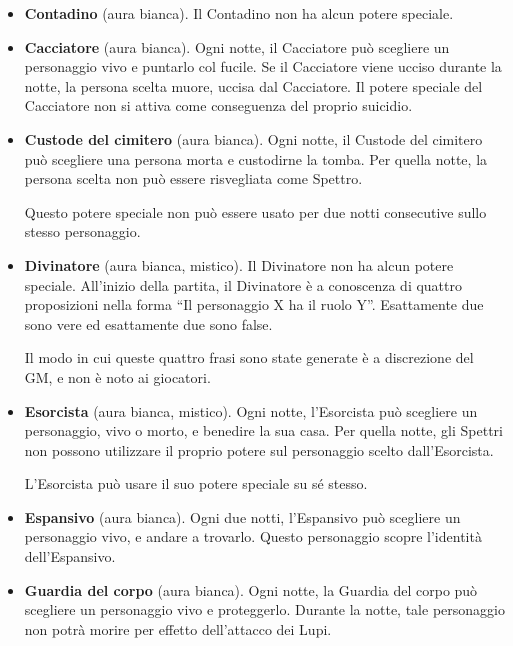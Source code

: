 \documentclass[a4paper,10pt]{article}
\begin{document}
\begin{itemize}
 \item {\bf Contadino} (aura bianca). Il Contadino non ha alcun potere speciale.

 \item {\bf Cacciatore} (aura bianca). Ogni notte, il Cacciatore può scegliere un personaggio vivo e puntarlo col fucile. Se il Cacciatore viene ucciso durante la notte, la persona scelta muore, uccisa dal Cacciatore.
 Il potere speciale del Cacciatore non si attiva come conseguenza del proprio suicidio.
 
 \item {\bf Custode del cimitero} (aura bianca). Ogni notte, il Custode del cimitero può scegliere una persona morta e custodirne la tomba. Per quella notte, la persona scelta non può essere risvegliata come Spettro.
 
 Questo potere speciale non può essere usato per due notti consecutive sullo stesso personaggio.

 \item {\bf Divinatore} (aura bianca, mistico). Il Divinatore non ha alcun potere speciale. All'inizio della partita, il Divinatore è a conoscenza di quattro proposizioni nella forma ``Il personaggio X ha il ruolo Y''. Esattamente due sono vere ed esattamente due sono false.
 
 Il modo in cui queste quattro frasi sono state generate è a discrezione del GM, e non è noto ai giocatori.

 \item {\bf Esorcista} (aura bianca, mistico). Ogni notte, l'Esorcista può scegliere un personaggio, vivo o morto, e benedire la sua casa.
 Per quella notte, gli Spettri non possono utilizzare il proprio potere sul personaggio scelto dall'Esorcista.
 
 L'Esorcista può usare il suo potere speciale su sé stesso.
 
 \item {\bf Espansivo} (aura bianca). Ogni due notti, l'Espansivo può scegliere un personaggio vivo, e andare a trovarlo. Questo personaggio scopre l'identità dell'Espansivo.

 \item {\bf Guardia del corpo} (aura bianca). Ogni notte, la Guardia del corpo può scegliere un personaggio vivo e proteggerlo. Durante la notte, tale personaggio non potrà morire per effetto dell'attacco dei Lupi.
 

\end{itemize}
\end{document}
